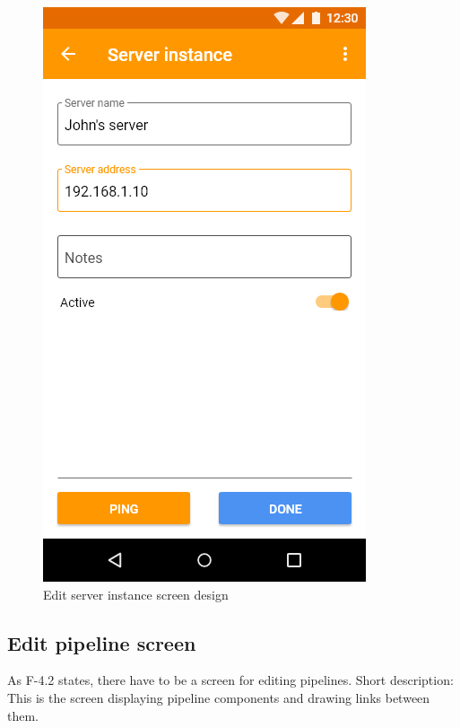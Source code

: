 \begin{figure}\centering
    \begin{minipage}[b]{0.32\textwidth}
    	\includegraphics[width=\textwidth]{pics/xd/Edit server instance.png}
    	\caption[Edit server instance]{Edit server instance screen design}\label{fig:xdEditServerInstance}
    \end{minipage}
\end{figure}

\subsection{Edit pipeline screen}
As F-4.2 states, there have to be a screen for editing pipelines.
Short description: This is the screen displaying pipeline components and drawing links between them.

